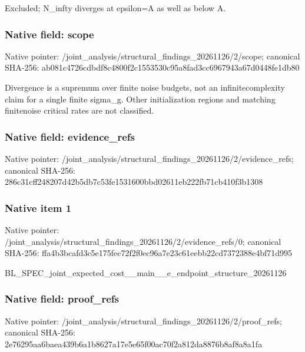\documentclass[10pt,a4paper]{article}
\begin{document}
Excluded; N\_infty diverges at epsilon=A as well as below A.


\subsubsection{Native field: scope}


Native pointer: /joint\_analysis/structur\allowbreak{}al\_findings\_20261126/2/s\allowbreak{}cope; canonical SHA-256: ab081c4726cdbdf8c4800f2c\allowbreak{}1553530c95a8fad3cc696794\allowbreak{}3a67d0448fe1db80


Divergence is a supremum over finite noise budgets, not an infinitecomplexity claim for a single finite sigma\_g. Other initialization regions and matching finitenoise critical rates are not classified.


\subsubsection{Native field: evidence\_refs}


Native pointer: /joint\_analysis/structur\allowbreak{}al\_findings\_20261126/2/e\allowbreak{}vidence\_refs; canonical SHA-256: 286c31cff248207d42b5db7c\allowbreak{}53fe1531600bbd02611eb222\allowbreak{}fb71cb410f3b1308



\subsubsection{Native item 1}


Native pointer: /joint\_analysis/structur\allowbreak{}al\_findings\_20261126/2/e\allowbreak{}vidence\_refs/0; canonical SHA-256: ffa4b3bcafd3c5e175fec72f\allowbreak{}2f0ec96a7e23c61eebb22cd7\allowbreak{}372388e4bf71d995


BL\_SPEC\_joint\_expected\_c\allowbreak{}ost\_\_main\_\_e\_endpoint\_st\allowbreak{}ructure\_20261126


\subsubsection{Native field: proof\_refs}


Native pointer: /joint\_analysis/structur\allowbreak{}al\_findings\_20261126/2/p\allowbreak{}roof\_refs; canonical SHA-256: 2e76295aa6baea439b6a1b86\allowbreak{}27a17e5e65f00ac70f2a812d\allowbreak{}a8876b8af8a8a1fa
\end{document}
